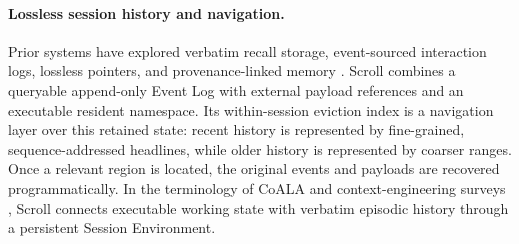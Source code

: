 \paragraph{Lossless session history and navigation.}
Prior systems have explored verbatim recall storage, event-sourced interaction logs, lossless pointers, and provenance-linked memory \citep{packer2023memgpt,nakajima2026log,ehrlich2026lcm,zhang2026mandol}.
Scroll combines a queryable append-only Event Log with external payload references and an executable resident namespace. Its within-session eviction index is a navigation layer over this retained state: recent history is represented by fine-grained, sequence-addressed headlines, while older history is represented by coarser ranges. Once a relevant region is located, the original events and payloads are recovered programmatically. In the terminology of CoALA \citep{sumers2024coala} and context-engineering surveys \citep{mei2025survey}, Scroll connects executable working state with verbatim episodic history through a persistent Session Environment.

